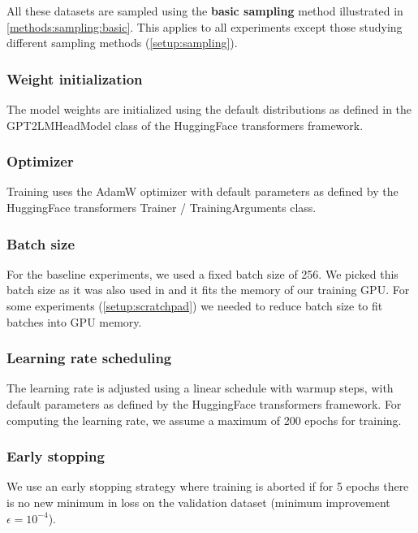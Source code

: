 All these datasets are sampled using the \textbf{basic sampling} method illustrated in \cref{methods:sampling:basic}. This applies to all experiments except those studying different sampling methods (\cref{setup:sampling}).

\subsubsection{Weight initialization}

The model weights are initialized using the default distributions as defined in the GPT2LMHeadModel class of the HuggingFace transformers framework.

\subsubsection{Optimizer}

Training uses the AdamW optimizer with default parameters as defined by the HuggingFace transformers Trainer / TrainingArguments class.

\subsubsection{Batch size}
\label{setup:batchsize}

For the baseline experiments, we used a fixed batch size of 256. We picked this batch size as it was also used in \cite{teaching} and it fits the memory of our training GPU. For some experiments (\cref{setup:scratchpad}) we needed to reduce batch size to fit batches into GPU memory.

\subsubsection{Learning rate scheduling}
\label{setup:learnrate}

The learning rate is adjusted using a linear schedule with warmup steps, with default parameters as defined by the HuggingFace transformers framework.
For computing the learning rate, we assume a maximum of 200 epochs for training.

\subsubsection{Early stopping}
\label{setup:early_stopping}

We use an early stopping strategy where training is aborted if for 5 epochs there is no new minimum in loss on the validation dataset (minimum improvement $\epsilon=10^{-4}$).

